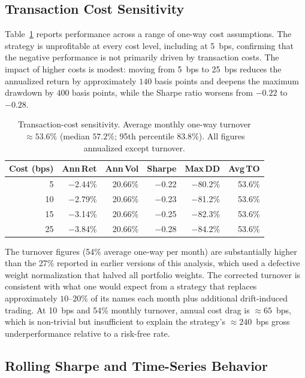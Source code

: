 \documentclass[11pt]{article}
\begin{document}
\subsection{Transaction Cost Sensitivity}

Table~\ref{tab:tc} reports performance across a range of one-way cost assumptions.
The strategy is unprofitable at every cost level, including at 5~bps, confirming that
the negative performance is not primarily driven by transaction costs. The impact of
higher costs is modest: moving from 5~bps to 25~bps reduces the annualized return by
approximately $140$ basis points and deepens the maximum drawdown by $400$ basis points,
while the Sharpe ratio worsens from $-0.22$ to $-0.28$.

\begin{table}[!ht]
\centering
\caption{Transaction-cost sensitivity. Average monthly one-way turnover $\approx 53.6\%$
         (median $57.2\%$; 95th percentile $83.8\%$). All figures annualized except
         turnover.}
\label{tab:tc}
\begin{tabular}{rrrrrr}
\toprule
Cost (bps) & Ann\,Ret & Ann\,Vol & Sharpe & Max\,DD & Avg\,TO \\
\midrule
\phantom{0}5  & $-$2.44\% & 20.66\% & $-$0.22 & $-$80.2\% & 53.6\% \\
10            & $-$2.79\% & 20.66\% & $-$0.23 & $-$81.2\% & 53.6\% \\
15            & $-$3.14\% & 20.66\% & $-$0.25 & $-$82.3\% & 53.6\% \\
25            & $-$3.84\% & 20.66\% & $-$0.28 & $-$84.2\% & 53.6\% \\
\bottomrule
\end{tabular}
\end{table}

The turnover figures (54\% average one-way per month) are substantially higher than
the 27\% reported in earlier versions of this analysis, which used a defective weight
normalization that halved all portfolio weights. The corrected turnover is consistent
with what one would expect from a strategy that replaces approximately $10$--$20\%$ of
its names each month plus additional drift-induced trading. At 10~bps and 54\% monthly
turnover, annual cost drag is $\approx65$~bps, which is non-trivial but insufficient
to explain the strategy's $\approx240$~bps gross underperformance relative to a
risk-free rate.

\subsection{Rolling Sharpe and Time-Series Behavior}
\end{document}
